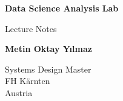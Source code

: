 \begin{titlepage}
	\begin{center}
		\vspace*{1cm}

		\textbf{\Large Data Science Analysis Lab}

		\vspace{0.5cm}
		\large Lecture Notes

		\vspace{1.5cm}

		\textbf{Metin Oktay Yılmaz}

		\vfill

		\vspace{0.8cm}


		Systems Design Master\\
		FH K\"arnten\\
		Austria\\
	\end{center}
\end{titlepage}